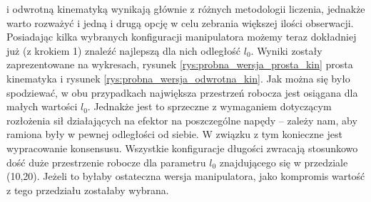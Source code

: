 \documentclass[printmode]{mgr}
\begin{document}
i odwrotną kinematyką wynikają głównie z różnych metodologii liczenia, jednakże warto rozważyć i jedną i drugą opcję w celu zebrania
większej ilości obserwacji. Posiadając kilka wybranych konfiguracji manipulatora możemy teraz dokładniej już (z krokiem 1) znaleźć
najlepszą dla nich odległość $l_0$. Wyniki zostały zaprezentowane na wykresach, rysunek \ref{rys:probna_wersja_prosta_kin} prosta kinematyka
i rysunek \ref{rys:probna_wersja_odwrotna_kin}. Jak można się było spodziewać, w obu przypadkach największa przestrzeń robocza jest
osiągana dla małych wartości $l_0$. Jednakże jest to sprzeczne z wymaganiem dotyczącym rozłożenia sił działających na efektor na
poszczególne napędy -- zależy nam, aby ramiona były w pewnej odległości od siebie. W związku z tym konieczne jest wypracowanie konsensusu.
Wszystkie konfiguracje długości zwracają stosunkowo dość duże przestrzenie robocze dla parametru $l_0$ znajdującego się w przedziale (10,20).
Jeżeli to byłaby ostateczna wersja manipulatora, jako kompromis wartość z tego przedziału zostałaby wybrana.
\end{document}
